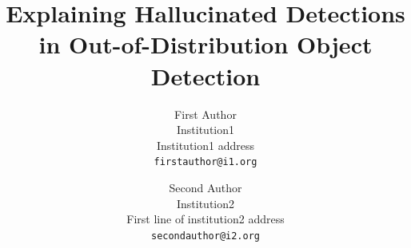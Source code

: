 \documentclass[10pt,twocolumn,letterpaper]{article}
\title{Explaining Hallucinated Detections in Out-of-Distribution Object Detection}
\author{First Author\\
Institution1\\
Institution1 address\\
{\tt\small firstauthor@i1.org}
\and
Second Author\\
Institution2\\
First line of institution2 address\\
{\tt\small secondauthor@i2.org}
}
\begin{document}
\maketitle
    





{
    \small
    
    
}

% 
\end{document}
